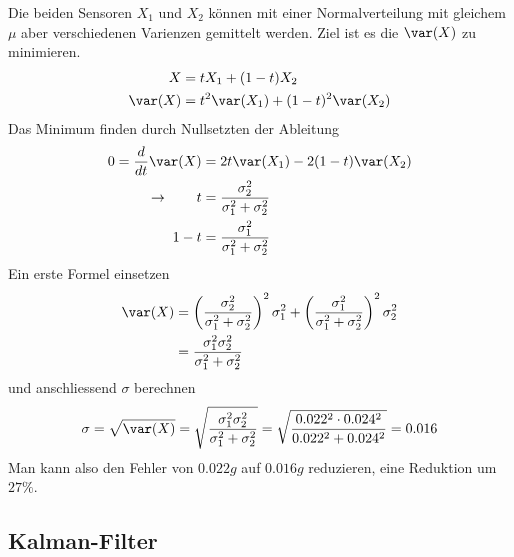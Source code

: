 Die beiden Sensoren $X_1$ und $X_2$ können mit einer Normalverteilung mit gleichem $\mu$ aber verschiedenen Varienzen gemittelt werden. Ziel ist es die $\var(X)$ zu minimieren. 
\begin{align*}
	X &= tX_1 + (1-t)X_2 \\
	\var(X) &= t^2\var(X_1) + (1-t)^2\var(X_2)
\end{align*}
Das Minimum finden durch Nullsetzten der Ableitung
\begin{align*}
	0 = \frac{d}{dt}\var(X) &= 2t\var(X_1) - 2(1-t)\var(X_2) \\
	\rightarrow  \qquad t &= \frac{\sigma_2^2}{\sigma_1^2 + \sigma_2^2} \\
	 1-t &= \frac{\sigma_1^2}{\sigma_1^2 + \sigma_2^2}
\end{align*}
Ein erste Formel einsetzen
\begin{align*}
	\var(X) &= \left(\frac{\sigma_2^2}{\sigma_1^2 + \sigma_2^2}\right)^2\sigma_1^2 + \left(\frac{\sigma_1^2}{\sigma_1^2 + \sigma_2^2}\right)^2\sigma_2^2 \\
	&= \frac{\sigma_1^2\sigma_2^2}{\sigma_1^2+\sigma_2^2}
\end{align*}
und anschliessend $\sigma$ berechnen
\[
\sigma = \sqrt{\var(X)} = \sqrt{\frac{\sigma_1^2\sigma_2^2}{\sigma_1^2+\sigma_2^2}} = \sqrt{\frac{0.022^2\cdot 0.024^2}{0.022^2 + 0.024^2}} = 0.016
\]  
Man kann also den Fehler von $0.022g$ auf $0.016g$ reduzieren, eine Reduktion um $27\%$.

\subsection{Kalman-Filter}
